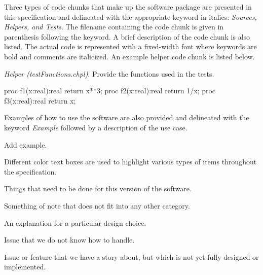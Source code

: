 \label{Notation}

Three types of code chunks that make up the software package are 
presented in this specification and delineated
with the appropriate keyword in italics: 
\textit{Sources, Helpers, and Tests}.  The filename containing the code
chunk is given in parenthesis following the keyword. A brief description 
of the code chunk is also listed.
The actual code is represented with a fixed-width font where keywords are
bold and comments are italicized. An example helper code chunk is listed
below.

\textit{Helper (testFunctions.chpl)}. Provide the functions used
in the tests.
\begin{chapel}
  proc f1(x:real):real {
    return x**3;
  } 
  proc f2(x:real):real {
    return 1/x;
  } 
  proc f3(x:real):real {
    return x;
  } 
\end{chapel}

Examples of how to use the software are also provided and delineated with the
keyword \textit{Example} followed by a description of the use case.

\begin{TODO}
  Add example.
\end{TODO}

Different color text boxes are used to highlight various types of items 
throughout the specification.

\begin{TODO}
  Things that need to be done for this version of the software.
\end{TODO}

\begin{note}
  Something of note that does not fit into any other category.
\end{note}

\begin{rationale}
  An explanation for a particular design choice.
\end{rationale}

\begin{openissue}
  Issue that we do not know how to handle.
\end{openissue}

\clearpage
\begin{future}
  Issue or feature that we have a story about, but which is not yet
  fully-designed or implemented. 
\end{future}
